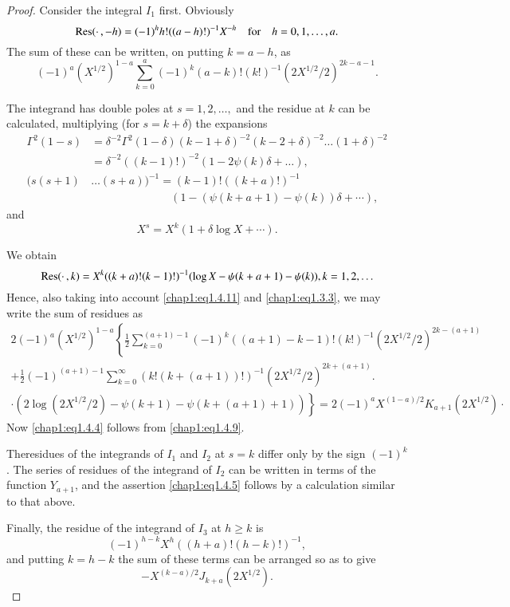 \begin{proof}
Consider the integral $I_1$ first. Obviously
$$
\operatorname{Res}(\cdotp,-h)=(-1)^hh!((a-h)!)^{-1}X^{-h}\quad\text{for}\quad h=0,
1,\ldots, a.
$$
The sum of these can be written, on putting $k=a-h$, as 
\begin{equation}\label{chap1:eq1.4.11} 
(-1)^a(X^{1/2})^{1-a}\sum\limits_{k=0}^a
(-1)^k(a-k)!(k!)^{-1}(2X^{1/2}/2)^{2k-a-1}.
\end{equation}

The integrand has double poles at $s=1,2,\ldots,$ and the residue at
$k$ can be calculated, multiplying (for $s=k+\delta$) the expansions 
\begin{align*}
\Gamma^2(1-s) &=
\delta^{-2}\Gamma^2(1-\delta)(k-1+\delta)^{-2}(k-2+\delta)^{-2} \ldots
(1+\delta)^{-2}\\
&= \delta^{-2}((k-1)!)^{-2}(1-2\psi(k)\delta+\ldots),\\
(s(s+1) &\ldots (s+a))^{-1}=(k-1)!((k+a)!)^{-1}\\
& \hspace{3cm}(1-(\psi(k+a+1)-
\psi(k))\delta +\cdots),
\end{align*}
and
$$
X^s=X^k(1+\delta \log X+\cdots).
$$

We obtain
$$
\operatorname{Res}(\cdotp,k)=X^k((k+a)!(k-1)!)^{-1}(\log X-\psi(k+a+1) -\psi(k)),
k=1,2,\ldots 
$$
Hence, also taking into account \eqref{chap1:eq1.4.11} and
\eqref{chap1:eq1.3.3}, we may write the sum of residues as 
{\fontsize{10}{11}\selectfont
\begin{multline*}
2(-1)^a(X^{1/2})^{1-a}\left\{\frac{1}{2}\sum\limits_{k=0}^{(a+1)-1}
(-1)^k((a+1)-k-1)!(k!)^{-1}(2X^{1/2}/2)^{2k-(a+1)}\right.\\
+\frac{1}{2}(-1)^{(a+1)-1}\sum\limits_{k=0}^\infty
(k!(k+(a+1))!)^{-1}(2X^{1/2}/2)^{2k+(a+1)}.\\
\cdotp(2\log(2X^{1/2}/2)-\psi(k+1)-\psi(k+(a+1)+1))\left.\right\} =2(-1)^a
X^{(1-a)/2} K_{a+1}(2X^{1/2})\cdotp
\end{multline*}}
Now \eqref{chap1:eq1.4.4} follows from \eqref{chap1:eq1.4.9}.

The\pageoriginale residues of the integrands of $I_1$ and $I_2$ at
$s=k$ differ only by the sign $(-1)^k$. The series of residues of the
integrand of $I_2$ can be written in terms of the function $Y_{a+1}$,
and the assertion \eqref{chap1:eq1.4.5} follows by a calculation
similar to that above.

Finally, the residue of the integrand of $I_3$ at $h\geq k$ is 
$$
(-1)^{h-k}X^h((h+a)!(h-k)!)^{-1},
$$
and putting $k=h-k$ the sum of these terms can be arranged so as
to give
$$
-X^{(k-a)/2}J_{k+a}(2X^{1/2}).
$$
\end{proof}

